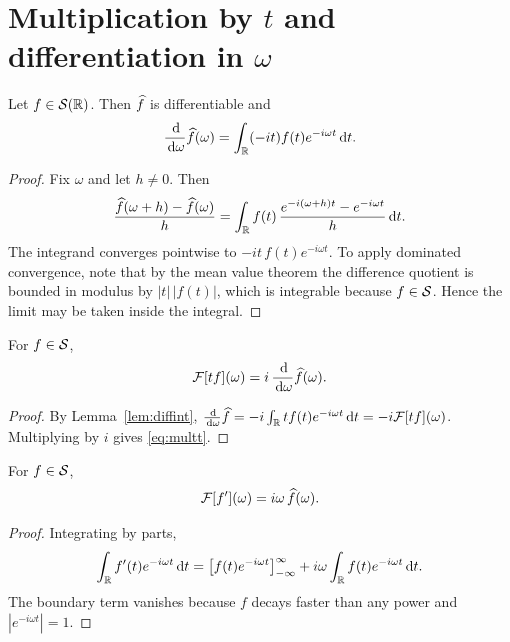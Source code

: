 \section{Multiplication by \texorpdfstring{$t$}{t} and differentiation in \texorpdfstring{$\omega$}{omega}}

\begin{lemma}\label{lem:diffint}
Let $f\in\mathcal{S}(\mathbb{R})$. Then $\widehat{f}$ is differentiable and
\begin{equation}
\frac{\,\mathrm{d}}{\,\mathrm{d}\omega}\widehat{f}(\omega)=\int_{\mathbb{R}}(-it)f(t)e^{-i\omega t}\,\mathrm{d} t .
\label{eq:diffint}
\end{equation}
\end{lemma}

\begin{proof}
Fix $\omega$ and let $h\neq0$. Then
\begin{equation}
\frac{\widehat{f}(\omega+h)-\widehat{f}(\omega)}{h}
=\int_{\mathbb{R}}f(t)\,\frac{e^{-i(\omega+h)t}-e^{-i\omega t}}{h}\,\mathrm{d} t .
\end{equation}
The integrand converges pointwise to $-it\,f(t)e^{-i\omega t}$. To apply dominated convergence,
note that by the mean value theorem the difference quotient is bounded in modulus by
$|t|\,|f(t)|$, which is integrable because $f\in\mathcal{S}$. Hence the limit may be taken inside the
integral.
\end{proof}

\begin{theorem}[multiplication by $t$]\label{thm:multt}
For $f\in\mathcal{S}$,
\begin{equation}
\mathcal{F}[tf](\omega)=i\,\frac{\,\mathrm{d}}{\,\mathrm{d}\omega}\widehat{f}(\omega).
\label{eq:multt}
\end{equation}
\end{theorem}

\begin{proof}
By Lemma~\ref{lem:diffint},
$\frac{\,\mathrm{d}}{\,\mathrm{d}\omega}\widehat{f}=-i\int_{\mathbb{R}}tf(t)e^{-i\omega t}\,\mathrm{d} t=-i\mathcal{F}[tf](\omega)$. Multiplying by
$i$ gives \eqref{eq:multt}.
\end{proof}

\begin{theorem}[differentiation in $t$]\label{thm:derivt}
For $f\in\mathcal{S}$,
\begin{equation}
\mathcal{F}[f'](\omega)=i\omega\,\widehat{f}(\omega).
\label{eq:derivt}
\end{equation}
\end{theorem}

\begin{proof}
Integrating by parts,
\begin{equation}
\int_{\mathbb{R}}f'(t)e^{-i\omega t}\,\mathrm{d} t
=\big[f(t)e^{-i\omega t}\big]_{-\infty}^{\infty}
+i\omega\int_{\mathbb{R}}f(t)e^{-i\omega t}\,\mathrm{d} t .
\end{equation}
The boundary term vanishes because $f$ decays faster than any power and $|e^{-i\omega t}|=1$.
\end{proof}

